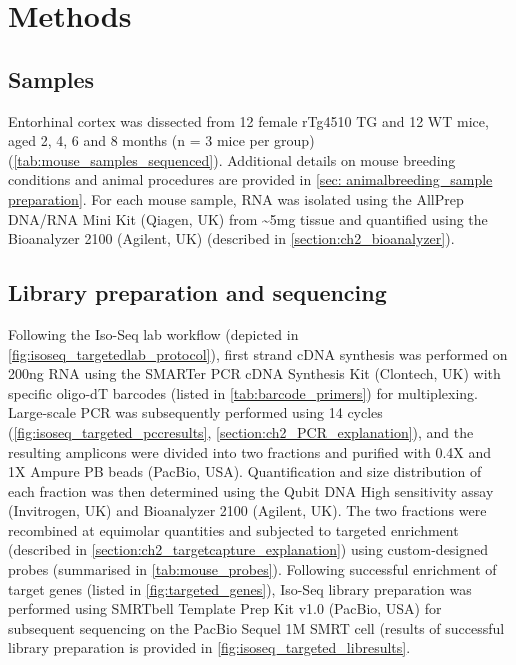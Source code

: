 \restoregeometry

 

\section{Methods}

\subsection{Samples}
Entorhinal cortex was dissected from 12 female rTg4510 TG and 12 WT mice, aged 2, 4, 6 and 8 months (n = 3 mice per group) (\cref{tab:mouse_samples_sequenced}). Additional details on mouse breeding conditions and animal procedures are provided in \cref{sec: animalbreeding_sample preparation}. For each mouse sample, RNA was isolated using the AllPrep DNA/RNA Mini Kit (Qiagen, UK) from \textasciitilde5mg tissue and quantified using the Bioanalyzer 2100 (Agilent, UK) (described in \cref{section:ch2_bioanalyzer}). 
 
\subsection{Library preparation and sequencing}
Following the Iso-Seq lab workflow (depicted in \cref{fig:isoseq_targetedlab_protocol}), first strand cDNA synthesis was performed on 200ng RNA using the SMARTer PCR cDNA Synthesis Kit (Clontech, UK) with specific oligo-dT barcodes (listed in \cref{tab:barcode_primers}) for multiplexing. Large-scale PCR was subsequently performed using 14 cycles (\cref{fig:isoseq_targeted_pccresults}, \cref{section:ch2_PCR_explanation}), and the resulting amplicons were divided into two fractions and purified with 0.4X and 1X Ampure PB beads (PacBio, USA). Quantification and size distribution of each fraction was then determined using the Qubit DNA High sensitivity assay (Invitrogen, UK) and Bioanalyzer 2100 (Agilent, UK). The two fractions were recombined at equimolar quantities and subjected to targeted enrichment (described in \cref{section:ch2_targetcapture_explanation}) using custom-designed probes (summarised in \cref{tab:mouse_probes}). Following successful enrichment of target genes (listed in \cref{fig:targeted_genes}), Iso-Seq library preparation was performed using SMRTbell Template Prep Kit v1.0 (PacBio, USA) for subsequent sequencing on the PacBio Sequel 1M SMRT cell (results of successful library preparation is provided in \cref{fig:isoseq_targeted_libresults}. 

